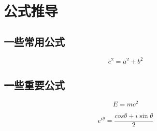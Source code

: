 \chapter{公式推导}

\section{一些常用公式}
\label{sec:someeq}

$$ c^{2} = a^{2} + b^{2} $$

\section{一些重要公式}
\label{sec:importanteq}

$$ E=mc^{2}$$

$$ e^{i\theta} = \frac{cos\theta + i \sin\theta}{2} $$


